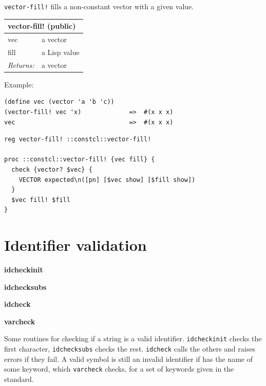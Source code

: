 \documentclass[twoside,9pt]{report}
\begin{document}
\texttt{vector-fill!} fills a non-constant vector with a given value.

\begin{tabular}{ |l l| }
\hline
\multicolumn{2}{|l|}{vector-fill! (public)} \\
\hline
vec & a vector \\
fill & a Lisp value \\
\textit{Returns:} & a vector \\
\hline
\end{tabular}


Example:

\noindent\makebox[\linewidth]{\rule{\linewidth}{0.4pt}}
\begin{lstlisting}
(define vec (vector 'a 'b 'c))
(vector-fill! vec 'x)             =>  #(x x x)
vec                               =>  #(x x x)
\end{lstlisting}
\noindent\makebox[\linewidth]{\rule{\linewidth}{0.4pt}}
\noindent\makebox[\linewidth]{\rule{\linewidth}{0.4pt}}
\begin{lstlisting}
reg vector-fill! ::constcl::vector-fill!
 
proc ::constcl::vector-fill! {vec fill} {
  check {vector? $vec} {
    VECTOR expected\n([pn] [$vec show] [$fill show])
  }
  $vec fill! $fill
}
\end{lstlisting}
\noindent\makebox[\linewidth]{\rule{\linewidth}{0.4pt}}
\chapter{Identifier validation}
\label{identifier-validation}

\textbf{idcheckinit}


\textbf{idchecksubs}


\textbf{idcheck}


\textbf{varcheck}


Some routines for checking if a string is a valid identifier. \texttt{idcheckinit} checks the first character, \texttt{idchecksubs} checks the rest. \texttt{idcheck} calls the others and raises errors if they fail. A valid symbol is still an invalid identifier if has the name of some keyword, which \texttt{varcheck} checks, for a set of keywords given in the standard.
\end{document}
